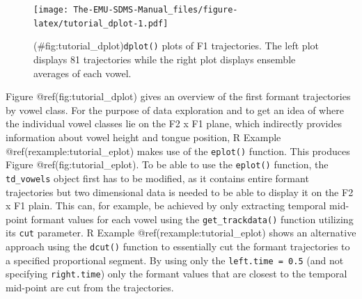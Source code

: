 \documentclass[]{book}
\newenvironment{Shaded}{\begin{snugshade}}{\end{snugshade}}
\newcommand{\KeywordTok}[1]{\textcolor[rgb]{0.13,0.29,0.53}{\textbf{{#1}}}}
\newcommand{\DataTypeTok}[1]{\textcolor[rgb]{0.13,0.29,0.53}{{#1}}}
\newcommand{\DecValTok}[1]{\textcolor[rgb]{0.00,0.00,0.81}{{#1}}}
\newcommand{\StringTok}[1]{\textcolor[rgb]{0.31,0.60,0.02}{{#1}}}
\newcommand{\CommentTok}[1]{\textcolor[rgb]{0.56,0.35,0.01}{\textit{{#1}}}}
\newcommand{\OtherTok}[1]{\textcolor[rgb]{0.56,0.35,0.01}{{#1}}}
\newcommand{\NormalTok}[1]{{#1}}
\theoremstyle{definition}
\theoremstyle{definition}
\theoremstyle{definition}
\theoremstyle{remark}
\begin{document}
\begin{Shaded}
\end{Shaded}

\begin{figure}
\centering
\texttt{[image: The-EMU-SDMS-Manual\_files/figure-latex/tutorial\_dplot-1.pdf]}
\caption{(\#fig:tutorial\_dplot)\texttt{dplot()} plots of F1
trajectories. The left plot displays 81 trajectories while the right
plot displays ensemble averages of each vowel.}
\end{figure}

Figure @ref(fig:tutorial\_dplot) gives an overview of the first formant
trajectories by vowel class. For the purpose of data exploration and to
get an idea of where the individual vowel classes lie on the F2 x F1
plane, which indirectly provides information about vowel height and
tongue position, R Example @ref(rexample:tutorial\_eplot) makes use of
the \texttt{eplot()} function. This produces Figure
@ref(fig:tutorial\_eplot). To be able to use the \texttt{eplot()}
function, the \texttt{td\_vowels} object first has to be modified, as it
contains entire formant trajectories but two dimensional data is needed
to be able to display it on the F2 x F1 plain. This can, for example, be
achieved by only extracting temporal mid-point formant values for each
vowel using the \texttt{get\_trackdata()} function utilizing its
\texttt{cut} parameter. R Example @ref(rexample:tutorial\_eplot) shows
an alternative approach using the \texttt{dcut()} function to
essentially cut the formant trajectories to a specified proportional
segment. By using only the \texttt{left.time\ =\ 0.5} (and not
specifying \texttt{right.time}) only the formant values that are closest
to the temporal mid-point are cut from the trajectories.
\end{document}
